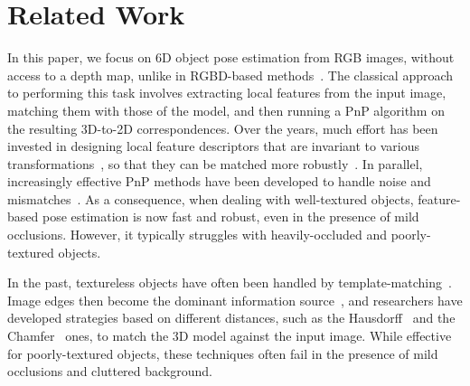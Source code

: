 \documentclass[10pt,twocolumn,letterpaper]{article}
\newcommand{\MS}[1]{{\color{green}{\bf MS: #1}}}
\newcommand{\MS}[1]{}
\newcommand{\comment}[1]{}
\begin{document}
\comment{In this context, the state-of-the-art methods typically rely on detection- or segmentation-based strategies to locate each individual object and regress either directly the pose or the 2D coordinates of keypoints~\cite{Rad17,Tekin18a} from which the pose can be obtained via a PnP algorithm. In doing so, these methods consider the object globally, aiming to produce a single pose estimate. This strategy, however, remains sensitive to the presence of large occlusions; for example, as illustrated in Fig.~\ref{}, \MS{Should we use the teaser figure to illustrate this with a case where PoseCNN fails?} the bounding box around an occluded object incorporates irrelevant information coming from other objects, which contaminates the information input to the pose regressor and thus degrades the pose accuracy. As a consequence, many methods thus require an additional, costly pose refinement~\cite{Li18a}.}

 

\section{Related Work}
\label{sec:related}

In this paper, we focus on 6D object pose estimation from RGB images, without access to a depth map, unlike in RGBD-based methods~\cite{Hinterstoisser12b,Brachmann14,Brachmann16a,Michel17}. The classical approach to performing this task involves extracting local features from the input image, matching them with those of the model, and then running a PnP algorithm on the resulting 3D-to-2D correspondences. Over the years, much effort has been invested in designing local feature descriptors that are invariant to various transformations~\cite{Lowe04,Tola10,Trzcinski12c,Tulsiani15,Pavlakos17a,Ono18}, so that they can be matched more robustly~\cite{Muja09,Muja14,Hu16}. In parallel, increasingly effective PnP methods have been developed to handle noise and mismatches~\cite{Lepetit09,Zheng13,Li12c,Ferraz14}. As a consequence, when dealing with well-textured objects, feature-based pose estimation is now fast and robust, even in the presence of mild occlusions. However, it typically struggles with heavily-occluded and poorly-textured objects. 

In the past, textureless objects have often been handled by template-matching~\cite{Hinterstoisser12a,Hinterstoisser12b}. Image edges then become the dominant information source~\cite{li11,Lowe91}, and researchers have developed strategies based on different distances, such as the Hausdorff~\cite{Huttenlocher93} and the Chamfer~\cite{liu10a,Hsiao14a} ones, to match the 3D model against the input image. While effective for poorly-textured objects, these techniques often fail in the presence of mild occlusions and cluttered background.
\end{document}
